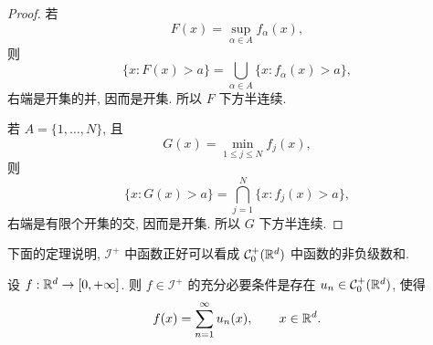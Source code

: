 \begin{proof}
	若
	\[
	F(x)=\sup_{\alpha\in A}f_\alpha(x),
	\]
	则
	\[
	\{x:F(x)>a\}
	=\bigcup_{\alpha\in A}\{x:f_\alpha(x)>a\},
	\]
	右端是开集的并, 因而是开集. 所以 \(F\) 下方半连续.
	
	若 \(A=\{1,\ldots,N\}\), 且
	\[
	G(x)=\min_{1\leq j\leq N}f_j(x),
	\]
	则
	\[
	\{x:G(x)>a\}
	=\bigcap_{j=1}^{N}\{x:f_j(x)>a\},
	\]
	右端是有限个开集的交, 因而是开集. 所以 \(G\) 下方半连续.
\end{proof}

下面的定理说明, \(\mathcal I^+\) 中函数正好可以看成 \(\mathcal{C}_0^+(\mathbb{R}^d)\) 中函数的非负级数和.

\begin{thm}\label{thm:lsc-as-sum-c0-positive}
	设 \(f:\mathbb{R}^d\to[0,+\infty]\). 则 \(f\in\mathcal I^+\) 的充分必要条件是存在 \(u_n\in\mathcal{C}_0^+(\mathbb{R}^d)\), 使得
	\begin{equation}
		f(x)=\sum_{n=1}^{\infty}u_n(x),
		\qquad x\in\mathbb{R}^d.
		\label{eq:lsc-sum-c0-positive}
	\end{equation}
\end{thm}

